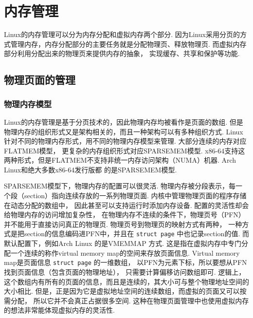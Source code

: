 \section{内存管理} \label{memory management}

Linux的内存管理可以分为内存分配和虚拟内存两个部分.\cite{silberschatz2021operating}
因为Linux采用分页的方式管理内存，内存分配部分的主要任务就是分配物理页、释放物理页.
而虚拟内存部分利用分配出来的物理页来提供内存的抽象，
实现缓存、共享和保护等功能.

\subsection{物理页面的管理}

\subsubsection{物理内存模型}
Linux的内存管理是基于分页技术的，因此物理内存均被看作是页面的数组.
但是物理内存的组织形式又是架构相关的，而且一种架构可以有多种组织方式.
Linux针对不同的物理内存形式，用不同的物理内存模型来管理.
大部分连续的内存对应FLATMEM模型，
更复杂的内存组织形式对应SPARSEMEM模型.\cite{Physical36:online}
x86-64支持这两种形式，但是FLATMEM不支持非统一内存访问架构（NUMA）机器.
Arch Linux和绝大多数x86-64发行版都%
的是SPARSEMEM模型.

SPARSEMEM模型下，物理内存的配置可以很灵活.
物理内存被分段表示，每一个段（section）指向连续存放的一系列物理页面.
内核中管理物理页面的程序存储在动态分配的数组中，
因此甚至可以支持运行时添加内存设备.
配置的灵活性却会给物理内存的访问增加复杂性，
在物理内存不连续的条件下，物理页号（PFN）并不能用于直接访问真正的物理页.
物理页号到物理页的映射方式有两种，
一种方式是把section的信息编码进PFN中，并且在 \lstinline{struct page}
中也记录section的值.
而默认配置下，例如Arch Linux 的是VMEMMAP 方式.
这是指在虚拟内存中专门分配一个连续的称作virtual memory map的空间来存放页面信息.
Virtual memory map是页面信息
\lstinline{struct page}
的一维数组，
以PFN为元素下标，所以要想从PFN找到页面信息（包含页面的物理地址），
只需要计算偏移访问数组即可.
逻辑上，这个数组内有所有的页面的信息，而且是连续的，其大小可与整个物理地址空间的大小相比.
但是，正是因为它是虚拟地址空间的连续数组，而虚拟的页面又可以按需分配，
所以它并不会真正占据很多空间.
这种在物理页面管理中也使用虚拟内存的想法非常能体现虚拟内存的灵活性.

